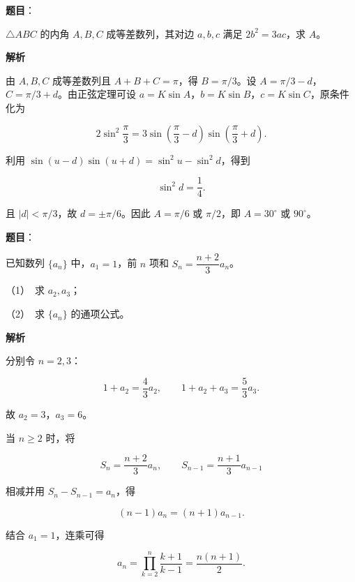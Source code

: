 \begin{answer}

\textbf{题目}：

$\triangle ABC$ 的内角 $A,B,C$ 成等差数列，其对边 $a,b,c$ 满足 $2b^2=3ac$，求 $A$。

\textbf{解析}

由 $A,B,C$ 成等差数列且 $A+B+C=\pi$，得 $B=\pi/3$。设 $A=\pi/3-d$，$C=\pi/3+d$。由正弦定理可设 $a=K\sin A$，$b=K\sin B$，$c=K\sin C$，原条件化为

\nopagebreak[4]
\[
2\sin^2\frac\pi3=3\sin\left(\frac\pi3-d\right)\sin\left(\frac\pi3+d\right).
\]

利用 $\sin(u-d)\sin(u+d)=\sin^2u-\sin^2d$，得到

\nopagebreak[4]
\[
\sin^2d=\frac14.
\]

且 $|d|<\pi/3$，故 $d=\pm\pi/6$。因此 $A=\pi/6$ 或 $\pi/2$，即 $A=30^\circ$ 或 $90^\circ$。


\end{answer}
\begin{answer}

\textbf{题目}：

已知数列 $\{a_n\}$ 中，$a_1=1$，前 $n$ 项和 $S_n=\dfrac{n+2}{3}a_n$。

（1）　求 $a_2,a_3$；

（2）　求 $\{a_n\}$ 的通项公式。

\textbf{解析}


分别令 $n=2,3$：

\nopagebreak[4]
\[
1+a_2=\frac43a_2,\qquad 1+a_2+a_3=\frac53a_3.
\]

故 $a_2=3$，$a_3=6$。


当 $n\geq2$ 时，将

\nopagebreak[4]
\[
S_n=\frac{n+2}{3}a_n,\qquad S_{n-1}=\frac{n+1}{3}a_{n-1}
\]

相减并用 $S_n-S_{n-1}=a_n$，得

\nopagebreak[4]
\[
(n-1)a_n=(n+1)a_{n-1}.
\]

结合 $a_1=1$，连乘可得

\nopagebreak[4]
\[
a_n=\prod_{k=2}^n\frac{k+1}{k-1}=\frac{n(n+1)}2.
\]



\end{answer}
